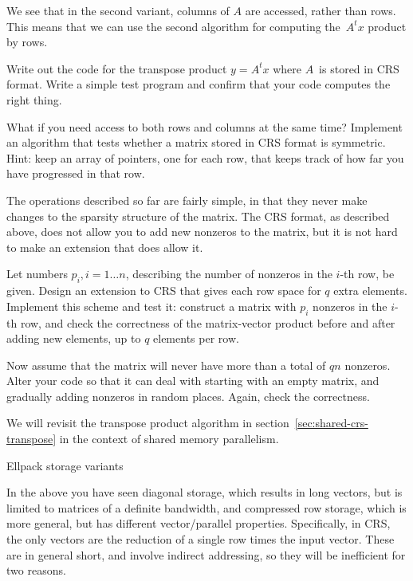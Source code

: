 We see that in the second variant, columns of $A$ are accessed, rather
than rows. This means that we can use the second algorithm for
computing the~$A^tx$ product by rows.

\begin{exercise}
  Write out the code for the transpose product $y=A^tx$ where $A$~is
  stored in \ac{CRS} format. Write a simple test program and confirm
  that your code computes the right thing.
\end{exercise}

\begin{exercise}
  What if you need access to both rows and columns at the same time?
  Implement an algorithm that tests whether a matrix stored in CRS
  format is symmetric. Hint: keep an array of pointers, one for each
  row, that keeps track of how far you have progressed in that row.
\end{exercise}

\begin{exercise}
The operations described so far are fairly simple, in that they never
make changes to the sparsity structure of the matrix. The CRS format,
as described above, does not allow you to add new nonzeros to the
matrix, but it is not hard to make an extension that does allow it.

Let numbers $p_i, i=1\ldots n$, describing the number of nonzeros in
the $i$-th row, be given.  Design an extension to CRS that gives each
row space for $q$ extra elements. Implement this scheme and test it:
construct a matrix with $p_i$ nonzeros in the $i$-th row, and check
the correctness of the matrix-vector product before and after adding
new elements, up to $q$ elements per row.

Now assume that the matrix will never have more than a total of $qn$
nonzeros. Alter your code so that it can deal with starting with an
empty matrix, and gradually adding nonzeros in random places. Again,
check the correctness.
\end{exercise}

We will revisit the transpose product algorithm in
section~\ref{sec:shared-crs-transpose} in the context of shared memory
parallelism.


 {Ellpack storage variants}
\label{sec:ellpack}

In the above you have seen diagonal storage,
which results in long vectors, but is limited to matrices
of a definite bandwidth,
and compressed row storage, which is more general,
but has different vector/parallel properties.
Specifically, in \ac{CRS}, the only vectors
are the reduction of a single row times the input vector.
These are in general short, and involve indirect addressing,
so they will be inefficient for two reasons.

